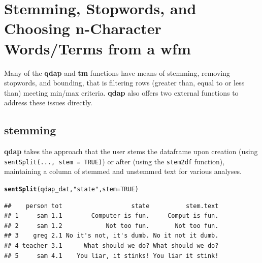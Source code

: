 \documentclass{article}\usepackage[]{graphicx}\usepackage[]{color}
\makeatletter
\newcommand{\hlnum}[1]{\textcolor[rgb]{0.686,0.059,0.569}{#1}}%
\newcommand{\hlstr}[1]{\textcolor[rgb]{0.192,0.494,0.8}{#1}}%
\newcommand{\hlstd}[1]{\textcolor[rgb]{0.345,0.345,0.345}{#1}}%
\newcommand{\hlkwc}[1]{\textcolor[rgb]{0.333,0.667,0.333}{#1}}%
\newcommand{\hlkwd}[1]{\textcolor[rgb]{0.737,0.353,0.396}{\textbf{#1}}}%
\newenvironment{kframe}{%
 \def\at@end@of@kframe{}%
 \ifinner\ifhmode%
  \def\at@end@of@kframe{\end{minipage}}%
  \begin{minipage}{\columnwidth}%
 \fi\fi%
 \def\FrameCommand##1{\hskip\@totalleftmargin \hskip-\fboxsep
 \colorbox{shadecolor}{##1}\hskip-\fboxsep
     \hskip-\linewidth \hskip-\@totalleftmargin \hskip\columnwidth}%
 \MakeFramed {\advance\hsize-\width
   \@totalleftmargin\z@ \linewidth\hsize
   \@setminipage}}%
 {\par\unskip\endMakeFramed%
 \at@end@of@kframe}
\newenvironment{knitrout}{}{} %
\makeatother
\begin{document}
\section{Stemming, Stopwords, and Choosing n-Character Words/Terms from a wfm}


\hspace{.4cm} Many of the \textbf{qdap} and \textbf{tm} functions have means of stemming, removing stopwords, and bounding, that is filtering rows (greater than, equal to or less than) meeting min/max criteria.  \textbf{qdap} also offers two external functions to address these issues directly.  


\subsection{stemming}

\hspace{.4cm} \textbf{qdap} takes the approach that the user stems the dataframe upon creation (using \texttt{sentSplit(..., stem = TRUE)}) or after (using the \texttt{stem2df} function), maintaining a column of stemmed and unstemmed text for various analyses.

\begin{knitrout}
\color{fgcolor}\begin{kframe}
\begin{alltt}
\hlkwd{sentSplit}\hlstd{(qdap_dat,} \hlstr{"state"}\hlstd{,} \hlkwc{stem} \hlstd{=} \hlnum{TRUE}\hlstd{)}
\end{alltt}
\end{kframe}
\end{knitrout}


\begin{knitrout}
\color{fgcolor}\begin{kframe}
\begin{verbatim}
##    person tot                   state          stem.text
## 1     sam 1.1        Computer is fun.     Comput is fun.
## 2     sam 1.2            Not too fun.       Not too fun.
## 3    greg 2.1 No it's not, it's dumb. No it not it dumb.
## 4 teacher 3.1      What should we do? What should we do?
## 5     sam 4.1    You liar, it stinks! You liar it stink!
\end{verbatim}
\end{kframe}
\end{knitrout}
\end{document}
